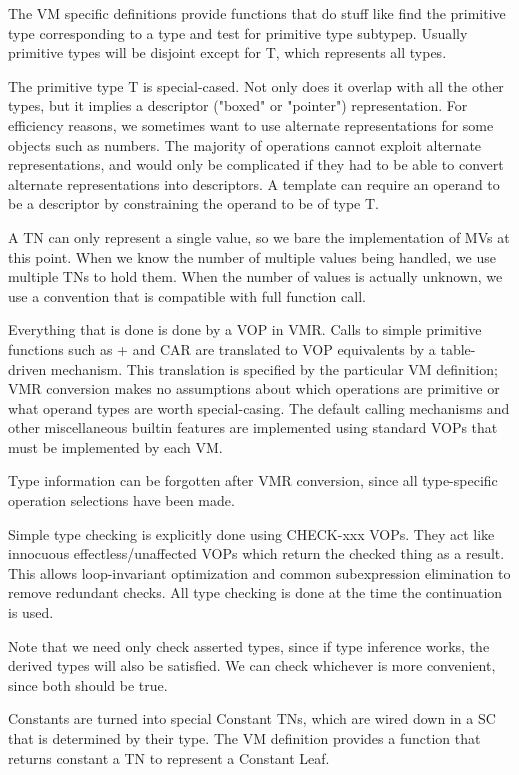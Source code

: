 The VM specific definitions provide functions that do stuff like find the
primitive type corresponding to a type and test for primitive type subtypep.
Usually primitive types will be disjoint except for T, which represents all
types.

The primitive type T is special-cased.  Not only does it overlap with all the
other types, but it implies a descriptor ("boxed" or "pointer") representation.
For efficiency reasons, we sometimes want to use
alternate representations for some objects such as numbers.  The majority of
operations cannot exploit alternate representations, and would only be
complicated if they had to be able to convert alternate representations into
descriptors.  A template can require an operand to be a descriptor by
constraining the operand to be of type T.

A TN can only represent a single value, so we bare the implementation of MVs at
this point.  When we know the number of multiple values being handled, we use
multiple TNs to hold them.  When the number of values is actually unknown, we
use a convention that is compatible with full function call.

Everything that is done is done by a VOP in VMR.  Calls to simple primitive
functions such as + and CAR are translated to VOP equivalents by a table-driven
mechanism.  This translation is specified by the particular VM definition; VMR
conversion makes no assumptions about which operations are primitive or what
operand types are worth special-casing.  The default calling mechanisms and
other miscellaneous builtin features are implemented using standard VOPs that
must be implemented by each VM.

Type information can be forgotten after VMR conversion, since all type-specific
operation selections have been made.

Simple type checking is explicitly done using CHECK-xxx VOPs.  They act like
innocuous effectless/unaffected VOPs which return the checked thing as a
result.  This allows loop-invariant optimization and common subexpression
elimination to remove redundant checks.  All type checking is done at the time
the continuation is used.

Note that we need only check asserted types, since if type inference works, the
derived types will also be satisfied.  We can check whichever is more
convenient, since both should be true.

Constants are turned into special Constant TNs, which are wired down in a SC
that is determined by their type.  The VM definition provides a function that
returns constant a TN to represent a Constant Leaf. 

